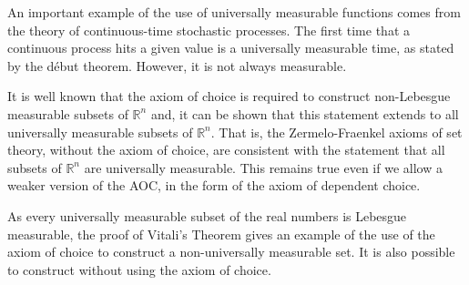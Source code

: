 \documentclass[12pt]{article}
\begin{document}
An important example of the use of universally measurable functions comes from the theory of continuous-time stochastic processes. The first time that a continuous process hits a given value is a universally measurable time, as stated by the d\'ebut theorem. However, it is not always measurable.

It is well known that the axiom of choice is required to construct non-Lebesgue measurable subsets of $\mathbb{R}^n$ and, it can be shown that this statement extends to all universally measurable subsets of $\mathbb{R}^n$. That is, the Zermelo-Fraenkel axioms of set  theory, without the axiom of choice, are consistent with the statement that all subsets of $\mathbb{R}^n$ are universally measurable. This remains true even if we allow a weaker version of the AOC, in the form of the axiom of dependent choice.

As every universally measurable subset of the real numbers is Lebesgue measurable, the proof of Vitali's Theorem gives an example of the use of the axiom of choice to construct a non-universally measurable set. It is also possible to construct  without using the axiom of choice.
\end{document}
